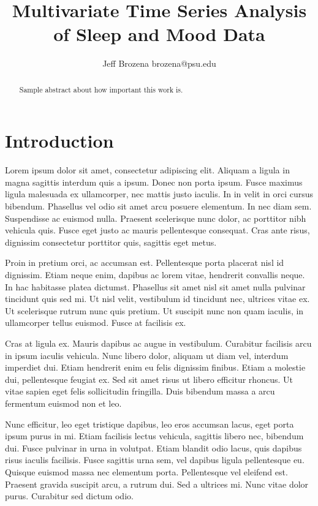 \documentclass{article}
\begin{document}
\title{Multivariate Time Series Analysis of Sleep and Mood Data}

\author{\name Jeff Brozena \email brozena@psu.edu}
\maketitle

\begin{abstract}%
  Sample abstract about how important this work is.
\end{abstract}

\section{Introduction}

\citep{ruwaardEcological}
\citet{ruwaardEcological}
Lorem ipsum dolor sit amet, consectetur adipiscing elit. Aliquam a ligula in magna sagittis interdum quis a ipsum. Donec non porta ipsum. Fusce maximus ligula malesuada ex ullamcorper, nec mattis justo iaculis. In in velit in orci cursus bibendum. Phasellus vel odio sit amet arcu posuere elementum. In nec diam sem. Suspendisse ac euismod nulla. Praesent scelerisque nunc dolor, ac porttitor nibh vehicula quis. Fusce eget justo ac mauris pellentesque consequat. Cras ante risus, dignissim consectetur porttitor quis, sagittis eget metus.

Proin in pretium orci, ac accumsan est. Pellentesque porta placerat nisl id dignissim. Etiam neque enim, dapibus ac lorem vitae, hendrerit convallis neque. In hac habitasse platea dictumst. Phasellus sit amet nisl sit amet nulla pulvinar tincidunt quis sed mi. Ut nisl velit, vestibulum id tincidunt nec, ultrices vitae ex. Ut scelerisque rutrum nunc quis pretium. Ut suscipit nunc non quam iaculis, in ullamcorper tellus euismod. Fusce at facilisis ex.

Cras at ligula ex. Mauris dapibus ac augue in vestibulum. Curabitur facilisis arcu in ipsum iaculis vehicula. Nunc libero dolor, aliquam ut diam vel, interdum imperdiet dui. Etiam hendrerit enim eu felis dignissim finibus. Etiam a molestie dui, pellentesque feugiat ex. Sed sit amet risus ut libero efficitur rhoncus. Ut vitae sapien eget felis sollicitudin fringilla. Duis bibendum massa a arcu fermentum euismod non et leo.

Nunc efficitur, leo eget tristique dapibus, leo eros accumsan lacus, eget porta ipsum purus in mi. Etiam facilisis lectus vehicula, sagittis libero nec, bibendum dui. Fusce pulvinar in urna in volutpat. Etiam blandit odio lacus, quis dapibus risus iaculis facilisis. Fusce sagittis urna sem, vel dapibus ligula pellentesque eu. Quisque euismod massa nec elementum porta. Pellentesque vel eleifend est. Praesent gravida suscipit arcu, a rutrum dui. Sed a ultrices mi. Nunc vitae dolor purus. Curabitur sed dictum odio.
\end{document}
